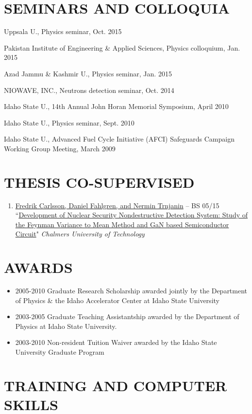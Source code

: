 \documentclass[paper=letter,fontsize=11pt]{scrartcl} %
\newcommand{\NewPart}[2]{\section*{\uppercase{#1} #2}}
\newcommand{\TalkEntry}[4]{
		\noindent #1, #2, #3 #4}
\newcommand{\ThesisEntry}[5]{
		\noindent #1 -- #2 #3 ``#4" \textit{#5}}
\begin{document}
\NewPart{Seminars and Colloquia}{}
\begin{etaremune}
\item\TalkEntry{Uppsala U.}{Physics seminar}{Oct. 2015}
\item\TalkEntry{Pakistan Institute of Engineering \& Applied Sciences}{Physics colloquium}{Jan. 2015}
\item\TalkEntry{Azad Jammu \& Kashmir U.}{Physics seminar}{Jan. 2015}
\item\TalkEntry{NIOWAVE, INC.}{Neutrons detection seminar}{Oct. 2014}
\item\TalkEntry{Idaho State U.}{14th Annual John Horan Memorial Symposium}{April 2010}
\item\TalkEntry{Idaho State U.}{Physics seminar}{Sept. 2010}
\item\TalkEntry{Idaho State U.}{Advanced Fuel Cycle Initiative (AFCI) Safeguards Campaign Working Group Meeting}{March 2009}
\end{etaremune}

\NewPart{Thesis Co-Supervised}{}
\begin{enumerate}
\item\ThesisEntry{\href{}{Fredrik Carlsson, Daniel Fahlgren, and Nermin Trnjanin}}{BS}{05/15}{\href{}{Development of Nuclear Security Nondestructive Detection System: Study of the Feynman Variance to Mean Method and GaN based Semiconductor Circuit}}{Chalmers University of Technology}
\end{enumerate}

\NewPart{Awards}{}
\begin{itemize}
\item 2005-2010 Graduate Research Scholarship awarded jointly by the Department of Physics \& the Idaho Accelerator Center at Idaho State University
\item 2003-2005 Graduate Teaching Assistantship awarded by the Department of Physics at Idaho State University.
\item 2003-2010 Non-resident Tuition Waiver awarded by the Idaho State University Graduate Program
\end{itemize}

\NewPart{TRAINING AND COMPUTER SKILLS}{}
\end{document}
